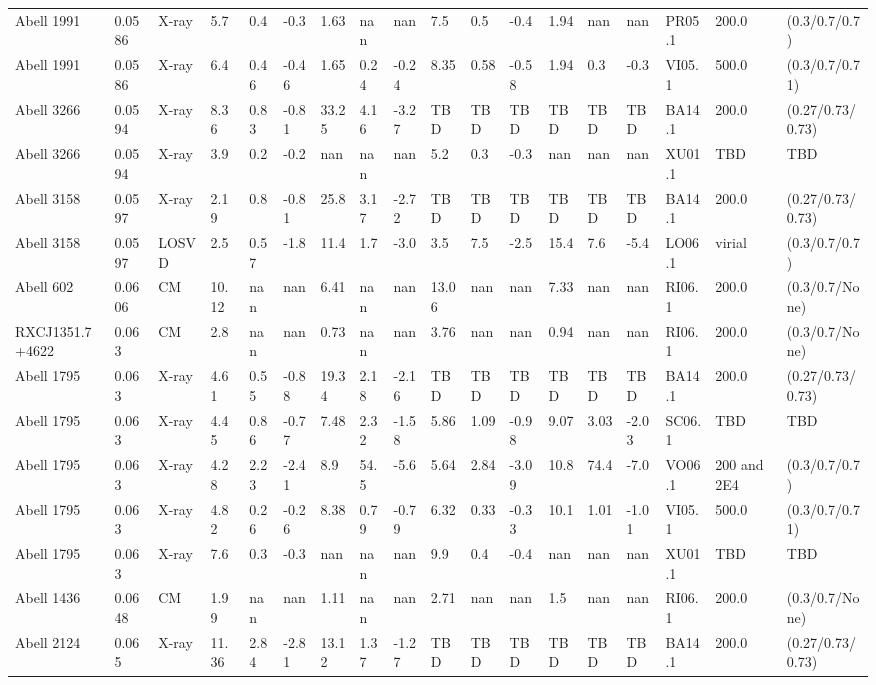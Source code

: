 \documentclass{article}
\begin{document}
\begin{center}
\begin{landscape}
\begin{longtable}{llllllllllllllllll}
Abell 1991 & 0.0586 & X-ray & 5.7 & 0.4 & -0.3 & 1.63 & nan & nan & 7.5 & 0.5 & -0.4 & 1.94 & nan & nan & PR05.1 & 200.0 & (0.3/0.7/0.7) \\
Abell 1991 & 0.0586 & X-ray & 6.4 & 0.46 & -0.46 & 1.65 & 0.24 & -0.24 & 8.35 & 0.58 & -0.58 & 1.94 & 0.3 & -0.3 & VI05.1 & 500.0 & (0.3/0.7/0.71) \\
Abell 3266 & 0.0594 & X-ray & 8.36 & 0.83 & -0.81 & 33.25 & 4.16 & -3.27 & TBD & TBD & TBD & TBD & TBD & TBD & BA14.1 & 200.0 & (0.27/0.73/0.73) \\
Abell 3266 & 0.0594 & X-ray & 3.9 & 0.2 & -0.2 & nan & nan & nan & 5.2 & 0.3 & -0.3 & nan & nan & nan & XU01.1 & TBD & TBD \\
Abell 3158 & 0.0597 & X-ray & 2.19 & 0.8 & -0.81 & 25.8 & 3.17 & -2.72 & TBD & TBD & TBD & TBD & TBD & TBD & BA14.1 & 200.0 & (0.27/0.73/0.73) \\
Abell 3158 & 0.0597 & LOSVD & 2.5 & 0.57 & -1.8 & 11.4 & 1.7 & -3.0 & 3.5 & 7.5 & -2.5 & 15.4 & 7.6 & -5.4 & LO06.1 & virial & (0.3/0.7/0.7) \\
Abell 602 & 0.0606 & CM & 10.12 & nan & nan & 6.41 & nan & nan & 13.06 & nan & nan & 7.33 & nan & nan & RI06.1 & 200.0 & (0.3/0.7/None) \\
RXCJ1351.7+4622 & 0.063 & CM & 2.8 & nan & nan & 0.73 & nan & nan & 3.76 & nan & nan & 0.94 & nan & nan & RI06.1 & 200.0 & (0.3/0.7/None) \\
Abell 1795 & 0.063 & X-ray & 4.61 & 0.55 & -0.88 & 19.34 & 2.18 & -2.16 & TBD & TBD & TBD & TBD & TBD & TBD & BA14.1 & 200.0 & (0.27/0.73/0.73) \\
Abell 1795 & 0.063 & X-ray & 4.45 & 0.86 & -0.77 & 7.48 & 2.32 & -1.58 & 5.86 & 1.09 & -0.98 & 9.07 & 3.03 & -2.03 & SC06.1 & TBD & TBD \\
Abell 1795 & 0.063 & X-ray & 4.28 & 2.23 & -2.41 & 8.9 & 54.5 & -5.6 & 5.64 & 2.84 & -3.09 & 10.8 & 74.4 & -7.0 & VO06.1 & 200 and 2E4 & (0.3/0.7/0.7) \\
Abell 1795 & 0.063 & X-ray & 4.82 & 0.26 & -0.26 & 8.38 & 0.79 & -0.79 & 6.32 & 0.33 & -0.33 & 10.1 & 1.01 & -1.01 & VI05.1 & 500.0 & (0.3/0.7/0.71) \\
Abell 1795 & 0.063 & X-ray & 7.6 & 0.3 & -0.3 & nan & nan & nan & 9.9 & 0.4 & -0.4 & nan & nan & nan & XU01.1 & TBD & TBD \\
Abell 1436 & 0.0648 & CM & 1.99 & nan & nan & 1.11 & nan & nan & 2.71 & nan & nan & 1.5 & nan & nan & RI06.1 & 200.0 & (0.3/0.7/None) \\
Abell 2124 & 0.065 & X-ray & 11.36 & 2.84 & -2.81 & 13.12 & 1.37 & -1.27 & TBD & TBD & TBD & TBD & TBD & TBD & BA14.1 & 200.0 & (0.27/0.73/0.73) \\

\end{longtable}
\end{landscape}
\end{center}
\end{document}
